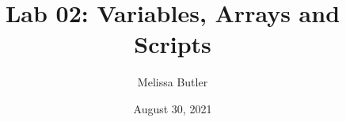 \newcommand{\course}{MATH 3341}
\title{Lab 02: Variables, Arrays and Scripts}
\author{Melissa Butler}
\date{August 30, 2021}
